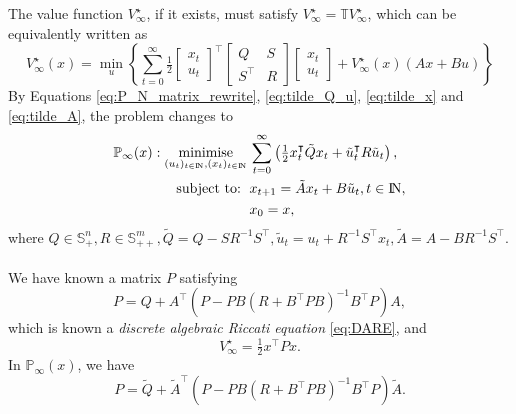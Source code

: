 \documentclass[a4paper,11pt,reqno]{amsart}
\newcommand{\N}{{\rm I\!N}}
\newcommand{\tran}{\intercal}
\DeclareMathOperator*{\minimise}{minimise}
\begin{document}
The value function $V^{\star}_{\infty}$, if it exists, must satisfy $V^{\star}_{\infty}=\mathbb{T}V^{\star}_{\infty}$, which can be equivalently written as
\begin{equation}
    V_{\infty}^{\star}(x)=\min_u
    \left\{
    \sum_{t=0}^{\infty}\tfrac{1}{2}
        \begin{bmatrix}
            x_t\\
            u_t
        \end{bmatrix}^{\tran}
        \begin{bmatrix}
            Q&S\\
            S^{\tran}&R
        \end{bmatrix}
        \begin{bmatrix}
            x_t\\
            u_t
        \end{bmatrix}
        +V_{\infty}^{\star}(x)(Ax+Bu)
    \right\} 
\end{equation}
By Equations \eqref{eq:P_N_matrix_rewrite}, \eqref{eq:tilde_Q_u}, \eqref{eq:tilde_x} and \eqref{eq:tilde_A}, the problem changes to 
\begin{subequations}
    \begin{align}
        \mathbb{P}_{\infty}(x): \minimise_{(u_t)_{t\in \N},(x_t)_{t\in \N}} \,
         & \sum_{t=0}^{\infty}\left(\textstyle\frac{1}{2}
         x_t^{\tran}\tilde{Q}x_t+\tilde{u}_t^{\tran}R\tilde{u}_t\right),
        \\
        \text{subject to: }\,
         & x_{t+1} = \tilde{A}x_t+B\tilde{u}_t, t\in\N,
        \\
         & x_{0} = x,
    \end{align}
\end{subequations}
where $Q\in \mathbb{S}^n_+, R\in \mathbb{S}^m_{++}, \tilde{Q}=Q-SR^{-1}S^{\tran}, \tilde{u}_t=u_t+R^{-1}S^{\tran}x_t, \tilde{A}=A-BR^{-1}S^{\tran}$.
\\ \\
We have known a matrix $P$ satisfying
\begin{equation}
    P=Q+A^{\tran}(P-PB(R+B^{\tran}PB)^{-1}B^{\tran}P)A,
    \tag{DARE}
    \label{eq:DARE}
\end{equation}
which is known a \emph{discrete algebraic Riccati equation} \eqref{eq:DARE}, and
\begin{equation}
    V^{\star}_{\infty}=\tfrac{1}{2}x^{\tran}Px.
\end{equation}
In $\mathbb{P}_{\infty}(x)$, we have
\begin{equation}
    P=\tilde{Q}+\tilde{A}^{\tran}(P-PB(R+B^{\tran}PB)^{-1}B^{\tran}P)\tilde{A}.
    \label{eq:P_N}
\end{equation}
\end{document}

